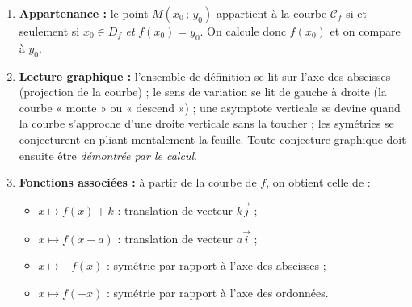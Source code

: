 \documentclass[11pt]{article}
\begin{document}
\begin{methode}
\begin{enumerate}
\item \textbf{Appartenance :} le point $M(x_0\,;\,y_0)$ appartient à la courbe $\mathcal{C}_f$ si et seulement si $x_0\in D_f$ \emph{et} $f(x_0)=y_0$. On calcule donc $f(x_0)$ et on compare à $y_0$.
\item \textbf{Lecture graphique :} l'ensemble de définition se lit sur l'axe des abscisses (projection de la courbe) ; le sens de variation se lit de gauche à droite (la courbe « monte » ou « descend ») ; une asymptote verticale se devine quand la courbe s'approche d'une droite verticale sans la toucher ; les symétries se conjecturent en pliant mentalement la feuille. Toute conjecture graphique doit ensuite être \emph{démontrée par le calcul}.
\item \textbf{Fonctions associées :} à partir de la courbe de $f$, on obtient celle de :
\begin{itemize}
\item $x\mapsto f(x)+k$ : translation de vecteur $k\vec{j}$ ;
\item $x\mapsto f(x-a)$ : translation de vecteur $a\vec{i}$ ;
\item $x\mapsto -f(x)$ : symétrie par rapport à l'axe des abscisses ;
\item $x\mapsto f(-x)$ : symétrie par rapport à l'axe des ordonnées.
\end{itemize}
\end{enumerate}
\end{methode}
\end{document}

